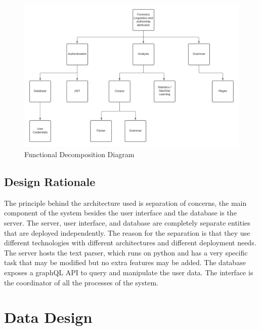 \begin{figure}[H]
    \includegraphics[width=15cm]{images/FDD.png}
    \caption{Functional Decomposition Diagram}
\end{figure}


\subsection{Design Rationale}
The principle behind the architecture used is separation of concerns, the main component of the system besides the user interface and the database is the server. The server, user interface, and database are completely separate entities that are deployed independently. The reason for the separation is that they use different technologies with different architectures and different deployment needs. The server hosts the text parser, which runs on python and has a very specific task that may be modified but no extra features may be added. The database exposes a graphQL API to query and manipulate the user data. The interface is the coordinator of all the processes of the system.


\section{Data Design}
